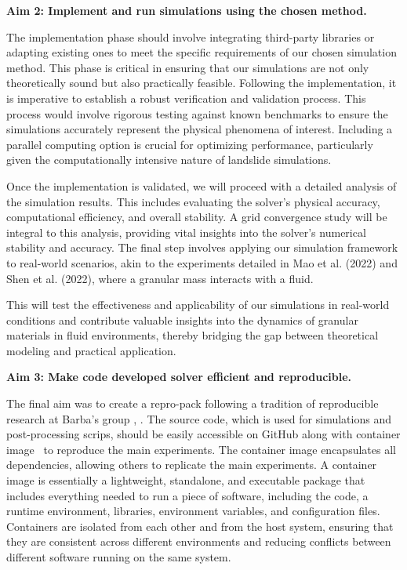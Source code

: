 \textbf{Aim 2: Implement and run simulations using the chosen method.} 

The implementation phase should involve integrating third-party libraries or adapting existing ones to meet the specific requirements of our chosen simulation method. This phase is critical in ensuring that our simulations are not only theoretically sound but also practically feasible. Following the implementation, it is imperative to establish a robust verification and validation process. This process would involve rigorous testing against known benchmarks to ensure the simulations accurately represent the physical phenomena of interest. Including a parallel computing option is crucial for optimizing performance, particularly given the computationally intensive nature of landslide simulations.

Once the implementation is validated, we will proceed with a detailed analysis of the simulation results. This includes evaluating the solver's physical accuracy, computational efficiency, and overall stability. A grid convergence study will be integral to this analysis, providing vital insights into the solver's numerical stability and accuracy.
The final step involves applying our simulation framework to real-world scenarios, akin to the experiments detailed in Mao et al. (2022)\cite{mao2020resolved} and Shen et al. (2022)\cite{shen2022resolved}, where a granular mass interacts with a fluid. 

This will test the effectiveness and applicability of our simulations in real-world conditions and contribute valuable insights into the dynamics of granular materials in fluid environments, thereby bridging the gap between theoretical modeling and practical application.

\textbf{Aim 3: Make code developed solver efficient and reproducible.}

The final aim was to create a repro-pack following a tradition of reproducible research at Barba's group \cite{barba2018terminologies}, \cite{Mesnard2023}. The source code, which is used for simulations and post-processing scrips, should be easily accessible on GitHub \cite{github} along with container image~ \cite{Docker_introduction} to reproduce the main experiments. The container image encapsulates all dependencies, allowing others to replicate the main experiments. A container image is essentially a lightweight, standalone, and executable package that includes everything needed to run a piece of software, including the code, a runtime environment, libraries, environment variables, and configuration files. Containers are isolated from each other and from the host system, ensuring that they are consistent across different environments and reducing conflicts between different software running on the same system.


